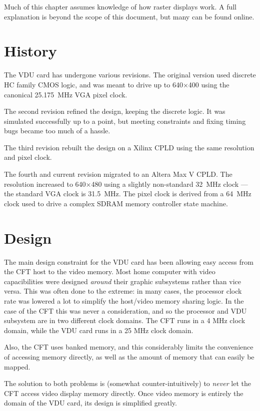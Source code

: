 Much of this chapter assumes knowledge of how raster displays work. A full
explanation is beyond the scope of this document, but many can be found online.



\section{History}

The VDU card has undergone various revisions. The original version
used discrete HC family CMOS logic, and was meant to drive up to
640×400 using the canonical 25.175~MHz VGA pixel clock.

The second revision refined the design, keeping the discrete logic. It
was simulated successfully up to a point, but meeting constraints and
fixing timing bugs became too much of a hassle.

The third revision rebuilt the design on a Xilinx CPLD using the same
resolution and pixel clock.

The fourth and current revision migrated to an Altera Max V CPLD. The
resolution increased to 640×480 using a slightly non-standard 32~MHz
clock — the standard VGA clock is 31.5~MHz. The pixel clock is derived
from a 64~MHz clock used to drive a complex SDRAM memory controller
state machine.

\section{Design}

The main design constraint for the VDU card has been allowing easy access from
the CFT host to the video memory. Most home computer with video capacibilities
were designed {\em around\/} their graphic subsystems rather than vice
versa. This was often done to the extreme: in many cases, the processor clock
rate was lowered a lot to simplify the host/video memory sharing logic. In the
case of the CFT this was never a consideration, and so the processor and VDU
subsystem are in two different clock domains. The CFT runs in a 4 MHz clock
domain, while the VDU card runs in a 25 MHz clock domain.

Also, the CFT uses banked memory, and this considerably limits the convenience
of accessing memory directly, as well as the amount of memory that can easily
be mapped.

The solution to both problems is (somewhat counter-intuitively) to {\em
  never\/} let the CFT access video display memory directly. Once video memory
is entirely the domain of the VDU card, its design is simplified greatly.

